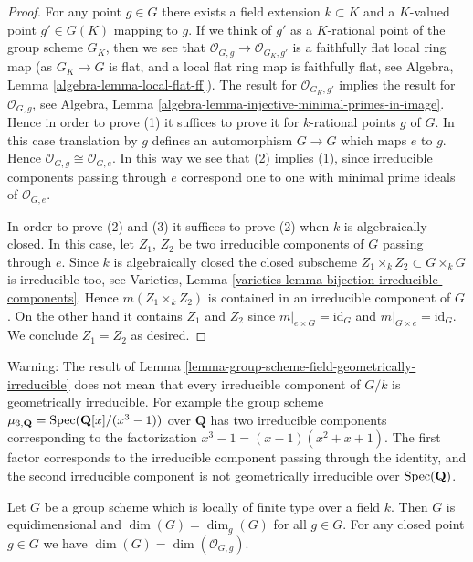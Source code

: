 \begin{proof}
For any point $g \in G$ there exists a field extension
$k \subset K$ and a $K$-valued point $g' \in G(K)$ mapping to
$g$. If we think of $g'$ as a $K$-rational point of the
group scheme $G_K$, then we see that
$\mathcal{O}_{G, g} \to \mathcal{O}_{G_K, g'}$ is a faithfully flat
local ring map (as $G_K \to G$ is flat, and a local flat ring map
is faithfully flat, see
Algebra, Lemma \ref{algebra-lemma-local-flat-ff}).
The result for $\mathcal{O}_{G_K, g'}$ implies the
result for $\mathcal{O}_{G, g}$, see
Algebra, Lemma \ref{algebra-lemma-injective-minimal-primes-in-image}.
Hence in order to prove (1) it suffices to
prove it for $k$-rational points $g$ of $G$. In this case
translation by $g$ defines an automorphism $G \to G$
which maps $e$ to $g$. Hence $\mathcal{O}_{G, g} \cong \mathcal{O}_{G, e}$.
In this way we see that (2) implies (1), since irreducible components
passing through $e$ correspond one to one with minimal prime ideals
of $\mathcal{O}_{G, e}$.

\medskip\noindent
In order to prove (2) and (3) it suffices to prove (2) when $k$
is algebraically closed. In this case, let $Z_1$, $Z_2$ be two
irreducible components of $G$ passing through $e$.
Since $k$ is algebraically closed the closed subscheme
$Z_1 \times_k Z_2 \subset G \times_k G$ is irreducible too, see
Varieties, Lemma \ref{varieties-lemma-bijection-irreducible-components}.
Hence $m(Z_1 \times_k Z_2)$ is contained in an irreducible
component of $G$. On the other hand it contains
$Z_1$ and $Z_2$ since $m|_{e \times G} = \text{id}_G$ and
$m|_{G \times e} = \text{id}_G$. We conclude $Z_1 = Z_2$ as desired.
\end{proof}

\begin{remark}
\label{remark-warning-group-scheme-geometrically-irreducible}
Warning: The result of
Lemma \ref{lemma-group-scheme-field-geometrically-irreducible}
does not mean that every irreducible component of $G/k$ is
geometrically irreducible. For example the group scheme
$\mu_{3, \mathbf{Q}} = \mathop{\rm Spec}(\mathbf{Q}[x]/(x^3 - 1))$
over $\mathbf{Q}$ has two irreducible components corresponding
to the factorization $x^3 - 1 = (x - 1)(x^2 + x + 1)$.
The first factor corresponds to the irreducible component
passing through the identity, and the second irreducible component
is not geometrically irreducible over $\mathop{\rm Spec}(\mathbf{Q})$.
\end{remark}

\begin{lemma}
\label{lemma-group-scheme-finite-type-field}
Let $G$ be a group scheme which is locally of finite type over a
field $k$. Then $G$ is equidimensional and
$\dim(G) = \dim_g(G)$ for all $g \in G$.
For any closed point $g \in G$ we have $\dim(G) = \dim(\mathcal{O}_{G, g})$.
\end{lemma}

